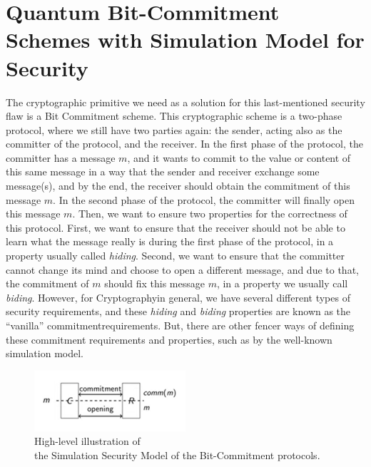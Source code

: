 \documentclass[12pt]{article}
\begin{document}
    \section{Quantum Bit-Commitment Schemes with Simulation Model for Security}
    \label{sec:quantum-bit-commitment-schemes-with-simulation-model-for-security}

    The cryptographic primitive we need as a solution for this last-mentioned security flaw is a Bit Commitment scheme. This cryptographic scheme is a two-phase protocol, where we still have two parties again: the sender, acting also as the committer of the protocol, and the receiver. In the first phase of the protocol, the committer has a message $m$, and it wants to commit to the value or content of this same message in a way that the sender and receiver exchange some message(s), and by the end, the receiver should obtain the commitment of this message $m$. In the second phase of the protocol, the committer will finally open this message $m$. Then, we want to ensure two properties for the correctness of this protocol. First, we want to ensure that the receiver should not be able to learn what the message really is during the first phase of the protocol, in a property usually called \textit{hiding}. Second, we want to ensure that the committer cannot change its mind and choose to open a different message, and due to that, the commitment of $m$ should fix this message $m$, in a property we usually call \textit{biding}. However, for Cryptography\break in general, we have several different types of security requirements, and these \textit{hiding} and \textit{biding} properties are known as the ``vanilla'' commitment\break requirements. But, there are other fencer ways of defining these commitment requirements and properties, such as by the well-known simulation model.

   \begin{figure}[ht]
        \captionsetup{justification=centering}
        \centering
        \includegraphics[width=0.5\textwidth]{figures/images/img-8.pdf}
        \caption{High-level illustration of\\ the Simulation Security Model of the Bit-Commitment protocols.}
        \label{fig:simulation-security-model-bit-commitment-protocols}
    \end{figure}
\end{document}
